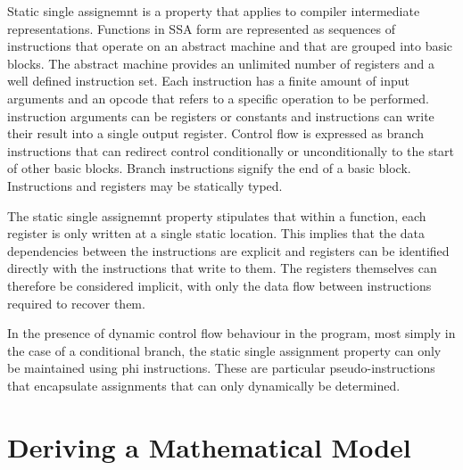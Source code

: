     Static single assignemnt is a property that applies to compiler intermediate
    representations.
    Functions in SSA form are represented as sequences of instructions that
    operate on an abstract machine and that are grouped into basic blocks.
    The abstract machine provides an unlimited number of registers and a well
    defined instruction set.
    Each instruction has a finite amount of input arguments and an opcode that
    refers to a specific operation to be performed.
    instruction arguments can be registers or constants and instructions can
    write their result into a single output register.
    Control flow is expressed as branch instructions that can redirect control
    conditionally or unconditionally to the start of other basic blocks.
    Branch instructions signify the end of a basic block.
    Instructions and registers may be statically typed.

    The static single assignemnt property stipulates that within a function,
    each register is only written at a single static location.
    This implies that the data dependencies between the instructions are
    explicit and registers can be identified directly with the instructions that
    write to them.
    The registers themselves can therefore be considered implicit, with only the
    data flow between instructions required to recover them.

    In the presence of dynamic control flow behaviour in the program, most
    simply in the case of a conditional branch, the static single assignment
    property can only be maintained using phi instructions.
    These are particular pseudo-instructions that encapsulate assignments that
    can only dynamically be determined.

\section{Deriving a Mathematical Model}

